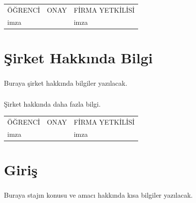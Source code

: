 \documentclass[12pt,a4paper]{report}
\begin{document}
  


\tableofcontents

\mbox{}
\vfill
\begin{center}
\begin{tabular}{|>{\centering}m{3.6cm}|>{\centering}m{7.4cm}|>{\centering}m{4cm}|}
ÖĞRENCİ&ONAY&FİRMA YETKİLİSİ
\tabularnewline
imza &&imza
\end{tabular}
\end{center}

\newpage
\chapter*{Şirket Hakkında Bilgi}

\paragraph{} Buraya şirket hakkında bilgiler yazılacak.
\paragraph{} Şirket hakkında daha fazla bilgi.
\mbox{}
\vfill
\begin{center}
\begin{tabular}{|>{\centering}m{3.6cm}|>{\centering}m{7.4cm}|>{\centering}m{4cm}|}
ÖĞRENCİ&ONAY&FİRMA YETKİLİSİ
\tabularnewline
imza &&imza
\end{tabular}
\end{center}

\newpage
\chapter*{Giriş}

\paragraph{} Buraya stajın konusu ve amacı hakkında kısa bilgiler yazılacak.
\end{document}
